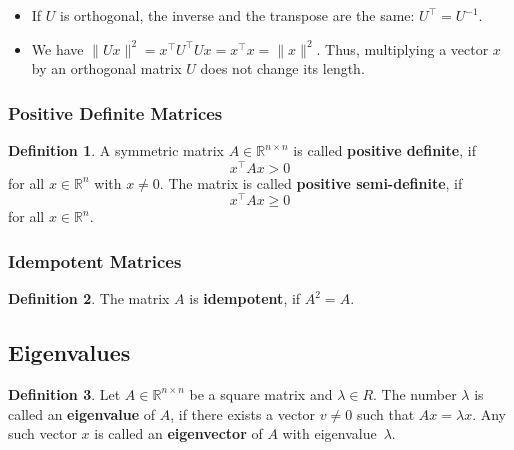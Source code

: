 \documentclass[
  a4paper,
]{article}
\theoremstyle{definition}
\newtheorem{definition}{Definition}[section]
\theoremstyle{definition}
\theoremstyle{definition}
\theoremstyle{definition}
\theoremstyle{remark}
\begin{document}
\begin{itemize}
\item
  If \(U\) is orthogonal, the inverse and the transpose are the same:
  \(U^\top = U^{-1}\).
\item
  We have \(\| U x \|^2 = x^\top U^\top U x = x^\top x = \| x \|^2\).
  Thus, multiplying a vector \(x\) by an orthogonal matrix \(U\) does
  not change its length.
\end{itemize}

\hypertarget{positive-definite}{%
\subsubsection{Positive Definite Matrices}\label{positive-definite}}

\begin{definition}
A symmetric matrix \(A \in \mathbb{R}^{n\times n}\) is called \textbf{positive definite}, if
\begin{equation*}
  x^\top A x > 0
\end{equation*}
for all \(x \in \mathbb{R}^n\) with \(x\neq 0\). The matrix is called
\textbf{positive semi-definite}, if
\begin{equation*}
  x^\top A x \geq 0
\end{equation*}
for all \(x \in \mathbb{R}^n\).
\end{definition}

\hypertarget{idempotent}{%
\subsubsection{Idempotent Matrices}\label{idempotent}}

\begin{definition}
The matrix \(A\) is \textbf{idempotent}, if \(A^2 = A\).
\end{definition}

\hypertarget{eigenvalues}{%
\subsection{Eigenvalues}\label{eigenvalues}}

\begin{definition}
Let \(A \in\mathbb{R}^{n\times n}\) be a square matrix and \(\lambda\in R\).
The number \(\lambda\) is called an \textbf{eigenvalue} of \(A\), if there
exists a vector \(v \neq 0\) such that \(A x = \lambda x\). Any
such vector \(x\) is called an \textbf{eigenvector} of \(A\) with eigenvalue~\(\lambda\).
\end{definition}
\end{document}
